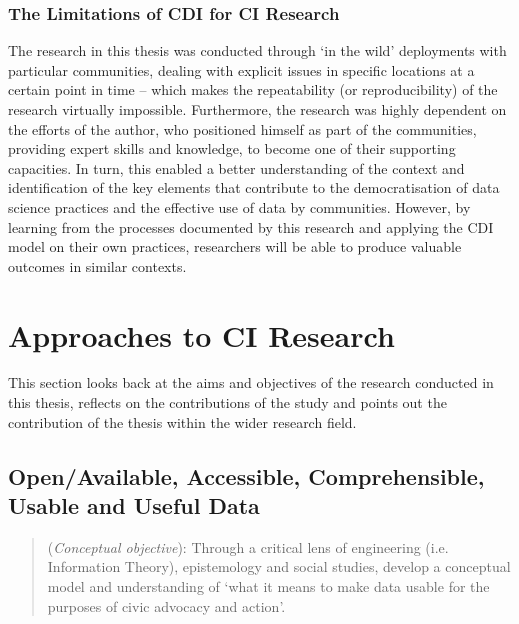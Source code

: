 \subsubsection{The Limitations of CDI for CI Research}
The research in this thesis was conducted through `in the wild' \citep{rogers_interaction_2011,taylor_leaving_2013} deployments with particular communities, dealing with explicit issues in specific locations at a certain point in time -- which makes the repeatability (or reproducibility) of the research virtually impossible. Furthermore, the research was highly dependent on the efforts of the author, who positioned himself as part of the communities, providing expert skills and knowledge, to become one of their supporting capacities. In turn, this enabled a better understanding of the context and identification of the key elements that contribute to the democratisation of data science practices and the effective use of data by communities. However, by learning from the processes documented by this research and applying the CDI model on their own practices, researchers will be able to produce valuable outcomes in similar contexts.

\section{Approaches to CI Research}
This section looks back at the aims and objectives of the research conducted in this thesis, reflects on the contributions of the study and points out the contribution of the thesis within the wider research field.

\subsection{Open/Available, Accessible, Comprehensible, Usable and Useful Data}
\begin{quote}
    (\textit{Conceptual objective}): Through a critical lens of engineering (i.e. Information Theory), epistemology and social studies, develop a conceptual model and understanding of `what it means to make data usable for the purposes of civic advocacy and action'.
\end{quote}

